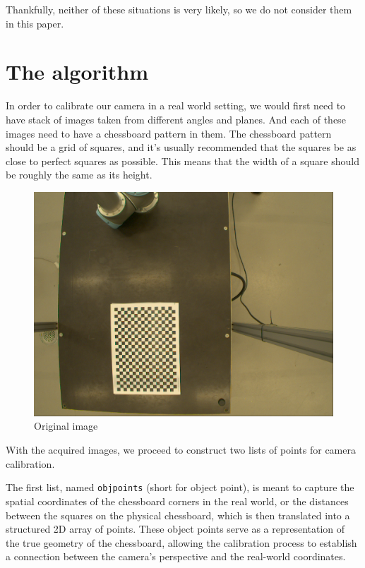 \documentclass{article}
\def\code#1{\texttt{#1}}
\begin{document}
Thankfully, neither of these situations is very likely, so we do not consider them in this paper. 


\section{The algorithm}

In order to calibrate our camera in a real world setting, we would first need to have stack of images taken from different angles and planes. And each of these images need to have a chessboard pattern in them. The chessboard pattern should be a grid of squares, and it's usually recommended that the squares be as close to perfect squares as possible. This means that the width of a square should be roughly the same as its height.

\begin{figure}[h]
    \centering
    \includegraphics[scale=0.12]{cali1.png}
    \caption{Original image}
    \label{k}
\end{figure}


With the acquired images, we proceed to construct two lists of points for camera calibration.

The first list, named \code{objpoints} (short for object point), is meant to capture the spatial coordinates of the chessboard corners in the real world, or the distances between the squares on the physical chessboard, which is then translated into a structured 2D array of points. These object points serve as a representation of the true geometry of the chessboard, allowing the calibration process to establish a connection between the camera's perspective and the real-world coordinates.
\end{document}
